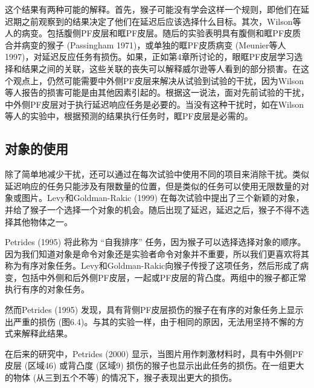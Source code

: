 这个结果有两种可能的解释。首先，猴子可能没有学会这样一个规则，即他们在延迟期之前观察到的结果决定了他们在延迟后应该选择什么目标。其次，Wilson等人的病变。包括腹侧PF皮层和眶PF皮层。随后的实验表明具有腹侧和眶PF皮质合并病变的猴子 (Passingham 1971)，或单独的眶PF皮质病变 (Meunier等人1997)，对延迟反应任务有损伤。如果，正如第4章所讨论的，眼眶PF皮层学习选择和结果之间的关联，这些关联的丧失可以解释威尔逊等人看到的部分损害。在这个观点上，仍然可能需要中外侧PF皮层来解决从试验到试验的干扰，因为Wilson等人报告的损害可能是由其他因素引起的。根据这一说法，面对先前试验的干扰，中外侧PF皮层对于执行延迟响应任务是必要的。当没有这种干扰时，如在Wilson等人的实验中，根据预测的结果执行任务时，眶PF皮层是必需的。

\subsection{对象的使用}
除了简单地减少干扰，还可以通过在每次试验中使用不同的项目来消除干扰。类似延迟响应的任务只能涉及有限数量的位置，但是类似的任务可以使用无限数量的对象或图片。Levy和Goldman-Rakic (1999) 在每次试验中提出了三个新颖的对象，并给了猴子一个选择一个对象的机会。随后出现了延迟，延迟之后，猴子不得不选择其他物体之一。

Petrides (1995) 将此称为 “自我排序” 任务，因为猴子可以选择选择对象的顺序。因为我们知道对象是命令对象还是实验者命令对象并不重要，所以我们更喜欢将其称为有序对象任务。Levy和Goldman-Rakic向猴子传授了这项任务，然后形成了病变，包括中外侧和后外侧PF皮层，一起或PF皮层的背凸度。两组中的猴子都正常执行有序的对象任务。

然而Petrides (1995) 发现，具有背侧PF皮层损伤的猴子在有序的对象任务上显示出严重的损伤 (图6.4)。与其的实验一样，由于相同的原因，无法用坚持不懈的方式来解释此结果。

在后来的研究中，Petrides (2000) 显示，当图片用作刺激材料时，具有中外侧PF皮层 (区域46) 或背凸度 (区域9) 损伤的猴子也显示出此任务的损伤。在一组更大的物体 (从三到五个不等) 的情况下，猴子表现出更大的损伤。

